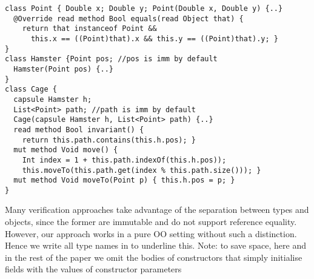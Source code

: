 
\begin{lstlisting}
class Point { Double x; Double y; Point(Double x, Double y) {..}
  @Override read method Bool equals(read Object that) {
    return that instanceof Point &&
      this.x == ((Point)that).x && this.y == ((Point)that).y; }
}
class Hamster {Point pos; //pos is imm by default
  Hamster(Point pos) {..} 
}
class Cage {
  capsule Hamster h;
  List<Point> path; //path is imm by default
  Cage(capsule Hamster h, List<Point> path) {..}
  read method Bool invariant() {
    return this.path.contains(this.h.pos); }
  mut method Void move() {
    Int index = 1 + this.path.indexOf(this.h.pos));
    this.moveTo(this.path.get(index % this.path.size())); }
  mut method Void moveTo(Point p) { this.h.pos = p; }
}
\end{lstlisting}
Many verification approaches take advantage of the separation between  types and objects, since the former are immutable and do not support reference equality.
However, our approach works in a pure OO setting without such a distinction. Hence we write all type names in \Q@BoldTitleCase@ to underline this. Note: to save space, here and in the rest of the paper we omit the bodies of constructors that simply initialise fields with the values of constructor parameters

